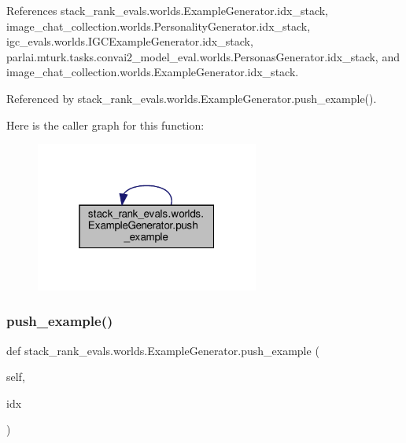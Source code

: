 References stack\+\_\+rank\+\_\+evals.\+worlds.\+Example\+Generator.\+idx\+\_\+stack, image\+\_\+chat\+\_\+collection.\+worlds.\+Personality\+Generator.\+idx\+\_\+stack, igc\+\_\+evals.\+worlds.\+I\+G\+C\+Example\+Generator.\+idx\+\_\+stack, parlai.\+mturk.\+tasks.\+convai2\+\_\+model\+\_\+eval.\+worlds.\+Personas\+Generator.\+idx\+\_\+stack, and image\+\_\+chat\+\_\+collection.\+worlds.\+Example\+Generator.\+idx\+\_\+stack.



Referenced by stack\+\_\+rank\+\_\+evals.\+worlds.\+Example\+Generator.\+push\+\_\+example().

Here is the caller graph for this function\+:
\nopagebreak
\begin{figure}[H]
\begin{center}
\leavevmode
\includegraphics[width=208pt]{classstack__rank__evals_1_1worlds_1_1ExampleGenerator_a75b62011b063cb2879cca50917383d0e_icgraph}
\end{center}
\end{figure}
\mbox{\label{classstack__rank__evals_1_1worlds_1_1ExampleGenerator_a75b62011b063cb2879cca50917383d0e}} 
\subsubsection{\texorpdfstring{push\+\_\+example()}{push\_example()}\hspace{0.1cm}{\footnotesize\ttfamily [2/2]}}
{\footnotesize\ttfamily def stack\+\_\+rank\+\_\+evals.\+worlds.\+Example\+Generator.\+push\+\_\+example (\begin{DoxyParamCaption}\item[{}]{self,  }\item[{}]{idx }\end{DoxyParamCaption})}



